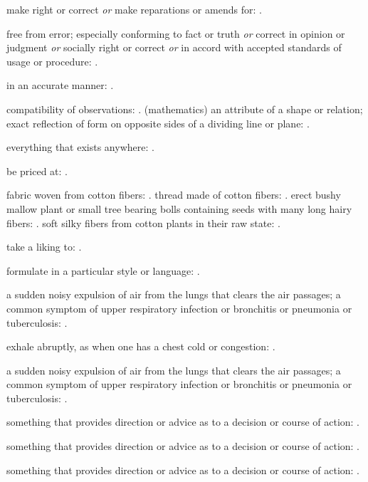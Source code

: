   make right or correct \textit{or} make reparations or amends for: .

  free from error; especially conforming to fact or truth \textit{or} correct in opinion or judgment \textit{or} socially right or correct \textit{or} in accord with accepted standards of usage or procedure: .

  in an accurate manner: .

  compatibility of observations: . (mathematics) an attribute of a shape or relation; exact reflection of form on opposite sides of a dividing line or plane: .

  everything that exists anywhere: .

  be priced at: .

  fabric woven from cotton fibers: . thread made of cotton fibers: . erect bushy mallow plant or small tree bearing bolls containing seeds with many long hairy fibers: . soft silky fibers from cotton plants in their raw state: .

  take a liking to: .

  formulate in a particular style or language: .

  a sudden noisy expulsion of air from the lungs that clears the air passages; a common symptom of upper respiratory infection or bronchitis or pneumonia or tuberculosis: .

  exhale abruptly, as when one has a chest cold or congestion: .

  a sudden noisy expulsion of air from the lungs that clears the air passages; a common symptom of upper respiratory infection or bronchitis or pneumonia or tuberculosis: .

  something that provides direction or advice as to a decision or course of action: .

  something that provides direction or advice as to a decision or course of action: .

  something that provides direction or advice as to a decision or course of action: .

